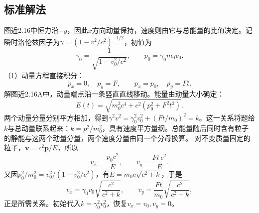 \documentclass[UTF8,fontset=fandol,a4paper,11pt]{ctexart}
\begin{document}


\subsection*{标准解法}


图近2.16中恒力沿$+y$，因此$x$方向动量保持，速度则由它与总能量的比值决定。记瞬时洛伦兹因子为$\gamma=(1-v^2/c^2)^{-1/2}$，初值为
\[
\gamma_0=\frac1{\sqrt{1-v_0^2/c^2}},\qquad
p_0=\gamma_0m_0v_0.
\]
（1）动量方程直接积分：
\[
\dot p_x=0,\quad \dot p_y=F,\qquad
\boxed{p_x=p_0,\quad p_y=Ft}.
\]
解图近2.16A中，动量端点沿一条竖直直线移动。能量由动量大小确定：
\[
E(t)=\sqrt{m_0^2c^4+c^2(p_0^2+F^2t^2)}.
\]
两个动量分量分别平方相加，得到$\gamma^2v^2=\gamma_0^2v_0^2+(Ft/m_0)^2=k$。这一关系将题给$k$与总动量联系起来：$k=p^2/m_0^2$，具有速度平方量纲。总能量随后同时含有粒子的静能与这两个动量分量，两个速度分量由同一个分母换算。
对不变质量固定的粒子，$\boldsymbol v=c^2\boldsymbol p/E$，所以
\[
v_x=\frac{p_0c^2}{E},\qquad
v_y=\frac{Ft\,c^2}{E}.
\]
又因$p_0^2/m_0^2=v_0^2/(1-v_0^2/c^2)$，有$E=m_0c\sqrt{c^2+k}$，于是
\[
\boxed{v_x=\gamma_0v_0\sqrt{\frac{c^2}{c^2+k}}},
\qquad
\boxed{v_y=\frac{Ft}{m_0}\sqrt{\frac{c^2}{c^2+k}}},
\]
正是所需关系。初始代入$k=\gamma_0^2v_0^2$，恢复$v_x=v_0,v_y=0$。
\end{document}

